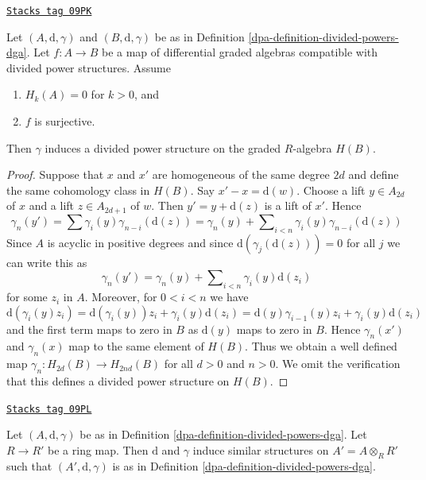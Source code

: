 \begin{lemma}
\label{dpa-lemma-dpdga-good}
\href{https://stacks.math.columbia.edu/tag/09PK}{\texttt{Stacks tag 09PK}}

Let $(A, \text{d}, \gamma)$ and $(B, \text{d}, \gamma)$ be as in
Definition \ref{dpa-definition-divided-powers-dga}. Let $f : A \to B$
be a map of differential graded algebras compatible with divided
power structures. Assume
\begin{enumerate}
\item $H_k(A) = 0$ for $k > 0$, and
\item $f$ is surjective.
\end{enumerate}
Then $\gamma$ induces a divided power structure on the graded
$R$-algebra $H(B)$.
\end{lemma}

\begin{proof}
Suppose that $x$ and $x'$ are homogeneous of the same degree $2d$
and define the same cohomology class in $H(B)$. Say $x' - x = \text{d}(w)$.
Choose a lift $y \in A_{2d}$ of $x$ and a lift $z \in A_{2d + 1}$
of $w$. Then $y' = y + \text{d}(z)$ is a lift of $x'$.
Hence
$$
\gamma_n(y') = \sum \gamma_i(y) \gamma_{n - i}(\text{d}(z))
= \gamma_n(y) +
\sum\nolimits_{i < n} \gamma_i(y) \gamma_{n - i}(\text{d}(z))
$$
Since $A$ is acyclic in positive degrees and since
$\text{d}(\gamma_j(\text{d}(z))) = 0$ for all $j$ we can write
this as
$$
\gamma_n(y') = \gamma_n(y) +
\sum\nolimits_{i < n} \gamma_i(y) \text{d}(z_i)
$$
for some $z_i$ in $A$. Moreover, for $0 < i < n$ we have
$$
\text{d}(\gamma_i(y) z_i) =
\text{d}(\gamma_i(y))z_i + \gamma_i(y)\text{d}(z_i) =
\text{d}(y) \gamma_{i - 1}(y) z_i + \gamma_i(y)\text{d}(z_i)
$$
and the first term maps to zero in $B$ as $\text{d}(y)$ maps to zero in $B$.
Hence $\gamma_n(x')$ and $\gamma_n(x)$ map to the same element of $H(B)$.
Thus we obtain a well defined map $\gamma_n : H_{2d}(B) \to H_{2nd}(B)$
for all $d > 0$ and $n > 0$. We omit the verification that this
defines a divided power structure on $H(B)$.
\end{proof}

\begin{lemma}
\label{dpa-lemma-base-change-div}
\href{https://stacks.math.columbia.edu/tag/09PL}{\texttt{Stacks tag 09PL}}

Let $(A, \text{d}, \gamma)$ be as in
Definition \ref{dpa-definition-divided-powers-dga}.
Let $R \to R'$ be a ring map.
Then $\text{d}$ and $\gamma$ induce similar structures on
$A' = A \otimes_R R'$ such that $(A', \text{d}, \gamma)$ is as in
Definition \ref{dpa-definition-divided-powers-dga}.
\end{lemma}

